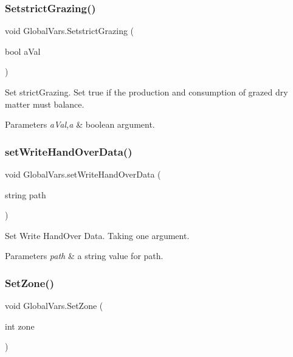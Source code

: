 \subsubsection{\texorpdfstring{SetstrictGrazing()}{SetstrictGrazing()}}
{\footnotesize\ttfamily void Global\+Vars.\+Setstrict\+Grazing (\begin{DoxyParamCaption}\item[{bool}]{a\+Val }\end{DoxyParamCaption})\hspace{0.3cm}{\ttfamily [inline]}}



Set strict\+Grazing. Set true if the production and consumption of grazed dry matter must balance. 


\begin{DoxyParams}{Parameters}
{\em a\+Val,a} & boolean argument. \\
\hline
\end{DoxyParams}
\mbox{\label{class_global_vars_aa0e41152bee501f128dc362540652326}} 
\subsubsection{\texorpdfstring{setWriteHandOverData()}{setWriteHandOverData()}}
{\footnotesize\ttfamily void Global\+Vars.\+set\+Write\+Hand\+Over\+Data (\begin{DoxyParamCaption}\item[{string}]{path }\end{DoxyParamCaption})\hspace{0.3cm}{\ttfamily [inline]}}



Set Write Hand\+Over Data. Taking one argument. 


\begin{DoxyParams}{Parameters}
{\em path} & a string value for path. \\
\hline
\end{DoxyParams}
\mbox{\label{class_global_vars_acbf66e9e99a98cb7d6e317afaba4519e}} 
\subsubsection{\texorpdfstring{SetZone()}{SetZone()}}
{\footnotesize\ttfamily void Global\+Vars.\+Set\+Zone (\begin{DoxyParamCaption}\item[{int}]{zone }\end{DoxyParamCaption})\hspace{0.3cm}{\ttfamily [inline]}}



